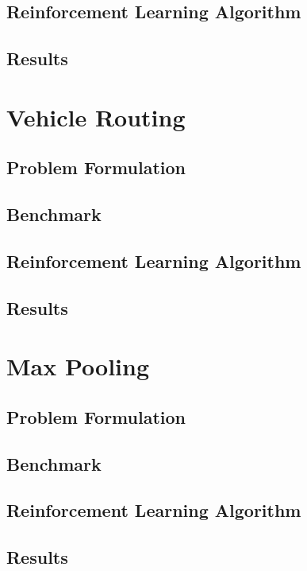 \documentclass[12pt]{article}
\begin{document}
\subsection{Reinforcement Learning Algorithm}

\subsection{Results}

\section{Vehicle Routing}

\subsection{Problem Formulation}

\subsection{Benchmark}

\subsection{Reinforcement Learning Algorithm}

\subsection{Results}

\section{Max Pooling}

\subsection{Problem Formulation}

\subsection{Benchmark}

\subsection{Reinforcement Learning Algorithm}

\subsection{Results}
\end{document}
